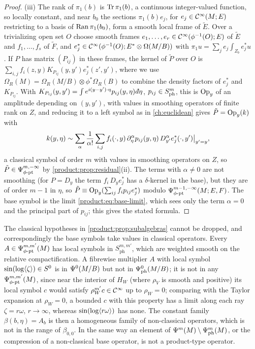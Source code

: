 \begin{proof}
(iii) The rank of $\pi_1(b)$ is $\operatorname{Tr}\pi_1(b)$, a continuous integer-valued function,
so locally constant, and near $b_0$ the sections $\pi_1(b)e_j$, for
$e_j\in\mathcal{C}^\infty(M;E)$ restricting to a basis of $\operatorname{Ran}\pi_1(b_0)$, form a smooth local
frame of $\tilde E$. Over a trivializing open set $O$ choose smooth frames
$e_1,\dots,e_r\in\mathcal{C}^\infty(\phi^{-1}(O);E)$ of $\tilde E$ and $f_1,\dots,f_s$ of
$\tilde F$, and $e^*_j\in\mathcal{C}^\infty(\phi^{-1}(O);E^*\otimes\Omega(M/B))$ with
$\pi_1u=\sum_je_j\int_{Z_b}e_j^*u$. If $P$ has matrix $(P_{ij})$ in these frames, the
kernel of $\tilde P$ over $O$ is
$\sum_{i,j}f_i(z,y)K_{P_{ij}}(y,y')e^*_j(z',y')$, where we use
$\Omega_R(M)=\Omega_R(M/B)\otimes\phi^*\Omega_R(B)$ to combine the density
factors of $e^*_j$ and $K_{P_{ij}}$. With
$K_{P_{ij}}(y,y')=\int e^{i(y-y')\cdot\eta}p_{ij}(y,\eta)\,\dbar\eta$,
$p_{ij}\in S^{m}_{\mathrm{ph}}$, this is $\operatorname{Op}_y$ of an amplitude depending on $(y,y')$, with
values in smoothing operators of finite rank on $Z$, and reducing it to a left
symbol as in \cref{ch:euclidean} gives $\tilde P=\operatorname{Op}_y(k)$ with
\begin{equation*}
k(y,\eta)\sim\sum_\alpha\frac1{\alpha!}\sum_{i,j}f_i(\cdot,y)\,
\partial_\eta^\alpha p_{ij}(y,\eta)\,D_{y'}^\alpha e_j^*(\cdot,y')\big|_{y'=y},
\end{equation*}
a classical symbol of order $m$ with values in smoothing operators on $Z$, so
$\tilde P\in\Psi^{m,-\infty}_{\phi\text{-}\mathrm{pt}}$ by \cref{product:prop:residual}(ii). The terms with
$\alpha\ne0$ are not smoothing (for $P=D_y$ the term
$f_i\,D_ye_j^*$ has a $\delta$-kernel in the base), but they are of order $m-1$ in
$\eta$, so $\tilde P\equiv\operatorname{Op}_y(\sum_{ij}f_ip_{ij}e_j^*)$ modulo
$\Psi^{m-1,-\infty}_{\phi\text{-}\mathrm{pt}}(M;E,F)$. The base symbol is the limit
\eqref{product:eq:base-limit}, which sees only the term $\alpha=0$ and the
principal part of $p_{ij}$; this gives the stated formula.
\end{proof}

\begin{remark}\label{product:rem:nonclassical}
The classical hypotheses in \cref{product:prop:subalgebras} cannot be dropped, and
correspondingly the base symbols take values in classical operators. Every
$A\in\Psi^{m,m'}_{\phi\text{-}\mathrm{pt}}(M)$ has local symbols in $S^{m,m'}_{\mathrm{ph}}$, which are
weighted smooth on the relative compactification. A fibrewise multiplier $A$ with
local symbol $\sin(\log\langle \zeta\rangle)\in S^0$ is in $\Psi^{0}(M/B)$ but not in
$\Psi^{0}_{\mathrm{ph}}(M/B)$; it is not in any $\Psi^{m,m'}_{\phi\text{-}\mathrm{pt}}(M)$, since near the
interior of $H_W$ (where $\rho_V$ is smooth and positive) its local symbol $c$
would satisfy $\rho_W^{m'}c\in\mathcal{C}^\infty$ up to $\rho_W=0$; comparing with the Taylor
expansion at $\rho_W=0$, a bounded $c$ with this property has a limit along each
ray $\zeta=r\omega$, $r\to\infty$, whereas $\sin(\log\langle r\omega\rangle)$ has none. The constant
family $\beta(b,\eta)=A_b$ is then a homogeneous family of non-classical operators,
which is not in the range of $\beta_{0,0}$. In the same way an element of
$\Psi^{m}(M)\setminus\Psi^{m}_{\mathrm{ph}}(M)$, or the compression of a
non-classical base operator, is not a product-type operator.
\end{remark}

